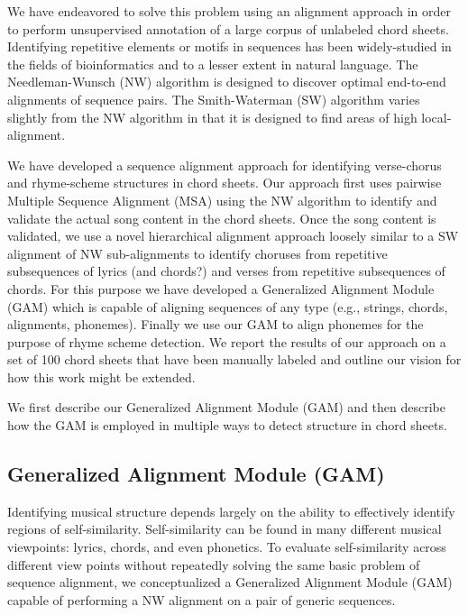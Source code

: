\documentclass[letterpaper]{article}
\begin{document}
We have endeavored to solve this problem using an alignment approach in order to perform unsupervised annotation of a large corpus of unlabeled chord sheets. Identifying repetitive elements or motifs in sequences has been widely-studied in the fields of bioinformatics and to a lesser extent in natural language. The Needleman-Wunsch (NW) algorithm is designed to discover optimal end-to-end alignments of sequence pairs. The Smith-Waterman (SW) algorithm varies slightly from the NW algorithm in that it is designed to find areas of high local-alignment.

We have developed a sequence alignment approach for identifying verse-chorus and rhyme-scheme structures in chord sheets. Our approach first uses pairwise Multiple Sequence Alignment (MSA) using the NW algorithm to identify and validate the actual song content in the chord sheets. Once the song content is validated, we use a novel hierarchical alignment approach loosely similar to a SW alignment of NW sub-alignments to identify choruses from repetitive subsequences of lyrics (and chords?) and verses from repetitive subsequences of chords. For this purpose we have developed a Generalized Alignment Module (GAM) which is capable of aligning sequences of any type (e.g., strings, chords, alignments, phonemes). Finally we use our GAM to align phonemes for the purpose of rhyme scheme detection. We report the results of our approach on a set of 100 chord sheets that have been manually labeled and outline our vision for how this work might be extended.

We first describe our Generalized Alignment Module (GAM) and then describe how the GAM is employed in multiple ways to detect structure in chord sheets.

\subsection{Generalized Alignment Module (GAM)}

Identifying musical structure depends largely on the ability to effectively identify regions of self-similarity. Self-similarity can be found in many different musical viewpoints: lyrics, chords, and even phonetics. To evaluate self-similarity across different view points without repeatedly solving the same basic problem of sequence alignment, we conceptualized a Generalized Alignment Module (GAM) capable of performing a NW alignment on a pair of generic sequences.
\end{document}
